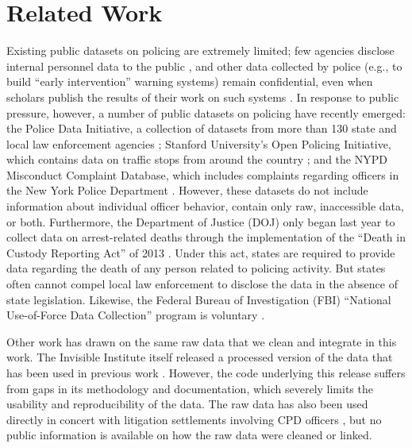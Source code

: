 \section{Related Work}\label{sec:related}
Existing public datasets on policing are extremely limited; 
few agencies disclose internal personnel data to the public \cite{Jackman21},
and other data collected by police (e.g., to build ``early intervention'' warning systems)
remain confidential, even when scholars publish the results of their 
work on such systems \cite{Helsby18}.
In response to public pressure, however, a number of
public datasets on policing have recently emerged: 
the Police Data Initiative, a collection of datasets from 
more than 130 state and local law enforcement agencies \cite{pdi};
Stanford University’s Open Policing Initiative, which contains
data on traffic stops from around the country \cite{sopp}; and
the NYPD Misconduct Complaint Database,
which includes complaints regarding officers in the New York Police Department \cite{nmcd}.
However, these datasets do not include information about individual officer behavior,
contain only raw, inaccessible data, or both.
Furthermore, the Department of Justice
(DOJ) only began last year to collect data on arrest-related deaths through the
implementation of the ``Death in Custody Reporting Act'' of 2013
\cite{DICRA2013}. Under this act, states are required to provide data regarding
the death of any person related to policing activity. But states often cannot compel local
law enforcement to disclose the data in the absence of state legislation.
Likewise, the Federal Bureau of Investigation (FBI) ``National Use-of-Force
Data Collection'' program is voluntary \cite{Gardner2020}.

Other work has drawn on the same raw data that we clean and integrate in this
work. The Invisible Institute itself released a processed version of
the data that has been used in previous work \cite{invisdata,ba2021role}. However, the
code underlying this release suffers from gaps in its methodology
and documentation, which severely limits the usability and reproducibility of
the data. The raw data has also been used directly in concert with litigation
settlements involving CPD officers \cite{Rozema19}, but no public information
is available on how the raw data were cleaned or linked.
